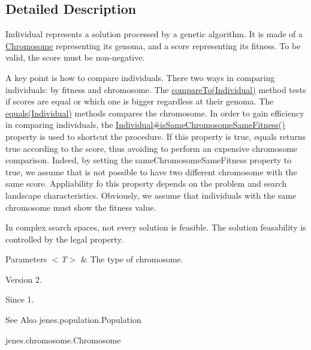 \subsection{Detailed Description}
Individual represents a solution processed by a genetic algorithm. It is made of a \hyperlink{}{Chromosome} representing its genoma, and a score representing its fitness. To be valid, the score must be non-\/negative. 

A key point is how to compare individuals. There two ways in comparing individuals\-: by fitness and chromosome. The \hyperlink{}{compare\-To(\-Individual)} method tests if scores are equal or which one is bigger regardless at their genoma. The \hyperlink{}{equals(\-Individual)} methods compares the chromosome. In order to gain efficiency in comparing individuals, the \hyperlink{}{Individual\#is\-Same\-Chromosome\-Same\-Fitness()} property is used to shortcut the procedure. If this property is true, {\ttfamily equals} returns true according to the score, thus avoiding to perform an expensive chromosome comparison. Indeed, by setting the {\ttfamily same\-Chromosome\-Same\-Fitness} property to true, we assume that is not possible to have two different chromosome with the same score. Appliability fo this property depends on the problem and search landscape characteristics. Obviously, we assume that individuals with the same chromosome must show the fitness value. 

In complex search spaces, not every solution is feasible. The solution feasability is controlled by the {\ttfamily legal} property.


\begin{DoxyParams}{Parameters}
{\em $<$\-T$>$} & The type of chromosome.\\
\hline
\end{DoxyParams}
\begin{DoxyVersion}{Version}
2. 
\end{DoxyVersion}
\begin{DoxySince}{Since}
1.
\end{DoxySince}
\begin{DoxySeeAlso}{See Also}
jenes.\-population.\-Population 

jenes.\-chromosome.\-Chromosome 
\end{DoxySeeAlso}


